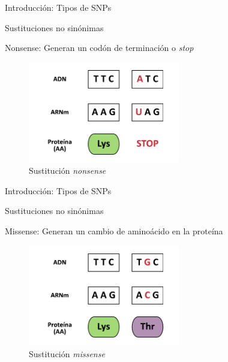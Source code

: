 \documentclass[
  spanish,
  ignorenonframetext,
]{beamer}
\begin{document}
\begin{frame}{Introducción: Tipos de SNPs}
\protect\hypertarget{introducciuxf3n-tipos-de-snps-1}{}

\begin{block}{Sustituciones no sinónimas}

Nonsense: Generan un codón de terminación o \textit{stop}

\end{block}

\begin{figure}
\centering
\includegraphics[width=2.60417in,height=\textheight]{nonsense_mutation.pdf}
\caption{Sustitución \textit{nonsense}}
\end{figure}

\end{frame}

\begin{frame}{Introducción: Tipos de SNPs}
\protect\hypertarget{introducciuxf3n-tipos-de-snps-2}{}

\begin{block}{Sustituciones no sinónimas}

Missense: Generan un cambio de aminoácido en la proteína

\end{block}

\begin{figure}
\centering
\includegraphics[width=2.60417in,height=\textheight]{missense_mutation.pdf}
\caption{Sustitución \textit{missense}}
\end{figure}

\end{frame}
\end{document}
